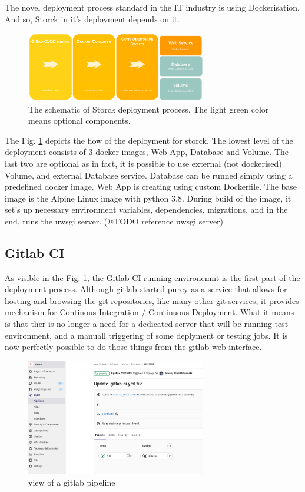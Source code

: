 The novel deployment process standard in the IT industry is using Dockerisation.
And so, Storck in it's deployment depends on it.

\begin{figure}[H]
\centering
\includegraphics[width=0.7\textwidth]{figures/chapter5/storck/storck_dockers.drawio.png}
\caption{The schematic of Storck deployment process. The light green color means optional components.}
\label{fig:storck-dockers}
\end{figure}

The Fig. \ref{fig:storck-dockers} depicts the flow of the deployment for storck.
The lowest level of the deployment consists of 3 docker images, Web App, Database and Volume.
The last two are optional as in fact, it is possible to use external (not dockerised) Volume, and external Database service.
Database can be runned simply using a predefined docker image.
Web App is creating using custom Dockerfile. The base image is the Alpine Linux image with python 3.8.
During build of the image, it set's up necessary environment variables, dependencies, migrations, and in the end, runs the uwsgi server.
(@TODO reference uwsgi server)

\subsection{Gitlab CI}

As visible in the Fig. \ref{fig:storck-dockers}, the Gitlab CI running environemnt is the first part of the deployment process.
Although gitlab started purey as a service that allows for hosting and browsing the git repositories, like many other git services, it provides mechanism for Continous Integration / Continuous Deployment.
What it means is that ther is no longer a need for a dedicated server that will be running test environment, and a manuall triggering of some deplyment or testing jobs.
It is now perfectly possible to do those things from the gitlab web interface.

\begin{figure}[H]
\centering
\includegraphics[width=0.7\textwidth]{figures/chapter5/storck/storck_gitlab.png}
\caption{view of a gitlab pipeline}
\label{fig:storck-gitlab}
\end{figure}


